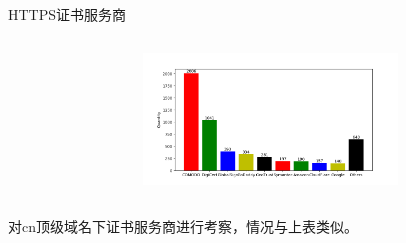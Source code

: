 \documentclass{beamer}
\begin{document}
\begin{frame}{HTTPS证书服务商}
\begin{columns}
\begin{column}{0.5\textwidth}
  \end{column}
  \begin{column}{0.5\textwidth}
    \begin{figure}
      \includegraphics[height=3.5cm]{images/figure/certserver.png}
      \end{figure}
  \end{column}
  \end{columns}

  对cn顶级域名下证书服务商进行考察，情况与上表类似。

    
  \end{frame}

  
\end{document}
